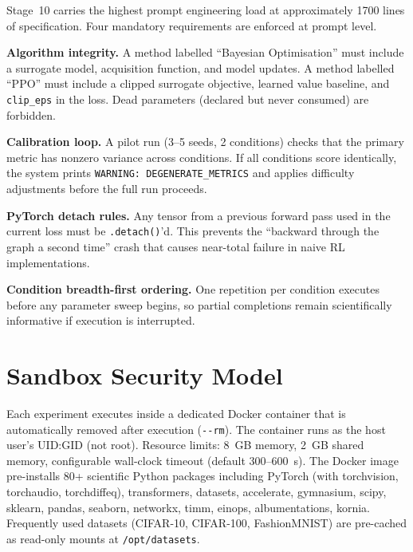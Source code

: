 \documentclass{llmxive}
\begin{document}
\begin{tcolorbox}[
  title={Stage~10 Deep Dive: \textsc{Code\_Generation}},
  colback=blue!3!white,
  colframe=blue!50!black,
  fonttitle=\bfseries\small,
  breakable,
  label={box:stage10-prompt},
]
Stage~10 carries the highest prompt engineering load at approximately 1700 lines of specification.
Four mandatory requirements are enforced at prompt level.

\smallskip
\noindent\textbf{Algorithm integrity.}
A method labelled ``Bayesian Optimisation'' must include a surrogate model, acquisition function, and model updates.
A method labelled ``PPO'' must include a clipped surrogate objective, learned value baseline, and \texttt{clip\_eps} in the loss.
Dead parameters (declared but never consumed) are forbidden.

\smallskip
\noindent\textbf{Calibration loop.}
A pilot run (3--5 seeds, 2 conditions) checks that the primary metric has nonzero variance across conditions.
If all conditions score identically, the system prints \texttt{WARNING: DEGENERATE\_METRICS} and applies difficulty adjustments before the full run proceeds.

\smallskip
\noindent\textbf{PyTorch detach rules.}
Any tensor from a previous forward pass used in the current loss must be \texttt{.detach()}'d.
This prevents the ``backward through the graph a second time'' crash that causes near-total failure in naive RL implementations.

\smallskip
\noindent\textbf{Condition breadth-first ordering.}
One repetition per condition executes before any parameter sweep begins, so partial completions remain scientifically informative if execution is interrupted.
\end{tcolorbox}

\section{Sandbox Security Model}
\label{app:sandbox}

Each experiment executes inside a dedicated Docker container that is automatically removed after execution (\texttt{-{}-rm}). The container runs as the host user's UID:GID (not root). Resource limits: 8~GB memory, 2~GB shared memory, configurable wall-clock timeout (default 300--600~s). The Docker image pre-installs 80+ scientific Python packages including PyTorch (with torchvision, torchaudio, torchdiffeq), transformers, datasets, accelerate, gymnasium, scipy, sklearn, pandas, seaborn, networkx, timm, einops, albumentations, kornia. Frequently used datasets (CIFAR-10, CIFAR-100, FashionMNIST) are pre-cached as read-only mounts at \texttt{/opt/datasets}.
\end{document}
